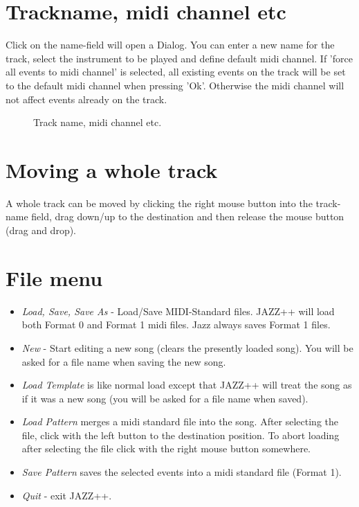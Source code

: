 \documentclass[letterpaper]{report}
\begin{document}
\section{Trackname, midi channel etc}\label{trackdlg}

Click on the name-field will open a Dialog. You can enter a new name for
the track, select the instrument to be played and define default midi channel.
If 'force all events to midi channel' is selected, all existing events on
the track will be set to the default midi channel when pressing 'Ok'.
Otherwise the midi channel will not affect events
already on the track.

\begin{figure}%
%
%
\caption{Track name, midi channel etc.}%
\end{figure}


\section{Moving a whole track}

A whole track can be moved by clicking the right mouse button into the
track-name field, drag down/up to the destination and then release the
mouse button (drag and drop).


\section{File menu}\label{file}

\begin{itemize}
\item {\em Load, Save, Save As} - Load/Save MIDI-Standard files.
JAZZ++ will load both Format 0 and Format 1 midi files. Jazz always
saves Format 1 files.

\item {\em New} - Start editing a new song (clears the presently loaded
song). You will be asked for a file name when saving the new song.

\item {\em Load Template} is like normal load except that JAZZ++ will
treat the song as if it was a new song (you will be asked for a file
name when saved).

\item {\em Load Pattern} merges a midi standard file into the song. After
selecting the file, click with the left button to the destination position.
To abort loading after selecting the file click with the right mouse button
somewhere.

\item {\em Save Pattern} saves the selected events into a midi standard
file (Format 1).

\item {\em Quit} - exit JAZZ++.

\end{itemize}
\end{document}
